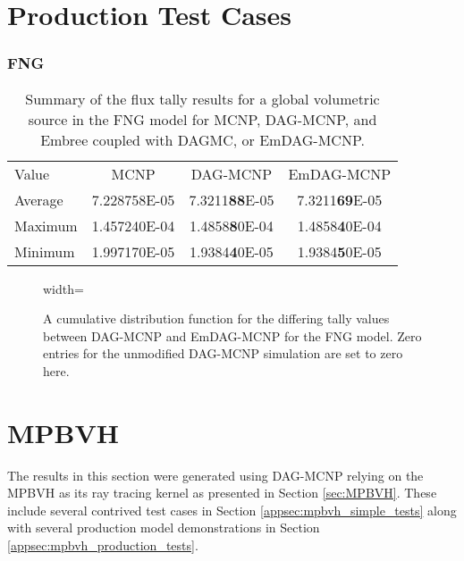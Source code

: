   \section{Production Test Cases}\label{appsec:emdag_fng}
  
  \subsubsection{FNG}

  \begin{table}[H]
    \small
    \begin{center}
      \begin{tabular}{lccc}
        \toprule
        Value & MCNP & DAG-MCNP & EmDAG-MCNP \\
        Average & 7.228758E-05 & 7.3211\textbf{88}E-05 & 7.3211\textbf{69}E-05 \\
        Maximum & 1.457240E-04 & 1.4858\textbf{8}0E-04 & 1.4858\textbf{4}0E-04 \\
        Minimum & 1.997170E-05 & 1.9384\textbf{4}0E-05 & 1.9384\textbf{5}0E-05 \\
      \end{tabular}
    \end{center}
    \caption[Flux tally results in FNG for various DAG-MCNP
      implementations.]{Summary of the flux tally results for a global
      volumetric source in the FNG model for MCNP, DAG-MCNP, and Embree coupled
      with DAGMC, or EmDAG-MCNP.}
  \end{table}

  \begin{figure}[H]
    \centering
    {width=\textwidth}
    \caption[Analysis of differing mesh tallies in FNG.]{A cumulative
      distribution function for the differing tally values between DAG-MCNP and
      EmDAG-MCNP for the FNG model. Zero entries for the unmodified DAG-MCNP
      simulation are set to zero here. }
  \end{figure}
  
  \section{MPBVH}

  The results in this section were generated using DAG-MCNP relying on the MPBVH
  as its ray tracing kernel as presented in Section \ref{sec:MPBVH}. These
  include several contrived test cases in Section
  \ref{appsec:mpbvh_simple_tests} along with several production model
  demonstrations in Section \ref{appsec:mpbvh_production_tests}.

